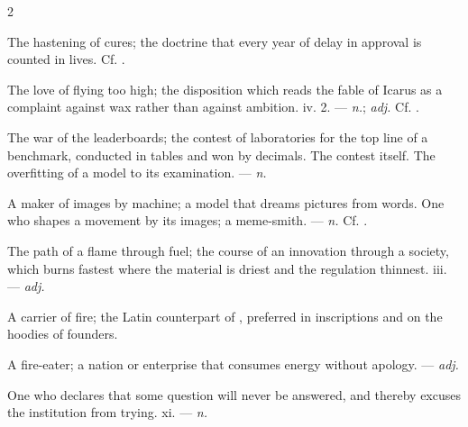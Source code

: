 \begin{multicols}{2}

 The hastening of cures; the doctrine that every year of delay in approval is counted in lives. Cf. .

 The love of flying too high; the disposition which reads the fable of Icarus as a complaint against wax rather than against ambition.   iv. 2. —  \textit{n.};  \textit{adj.} Cf. .

 The war of the leaderboards; the contest of laboratories for the top line of a benchmark, conducted in tables and won by decimals.  The contest itself.   The overfitting of a model to its examination.   —  \textit{n.}

  A maker of images by machine; a model that dreams pictures from words.   One who shapes a movement by its images; a meme-smith. —  \textit{n.} Cf. .

 The path of a flame through fuel;  the course of an innovation through a society, which burns fastest where the material is driest and the regulation thinnest.   iii. —  \textit{adj.}

 A carrier of fire; the Latin counterpart of , preferred in inscriptions and on the hoodies of founders.

 A fire-eater; a nation or enterprise that consumes energy without apology. —  \textit{adj.}

 One who declares that some question will never be answered, and thereby excuses the institution from trying.   xi. —  \textit{n.}


\end{multicols}
